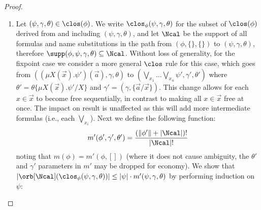 \begin{proof}
\begin{enumerate}
\begin{itemize}
			The case for $(\nu X(\vec x).\phi')(\vec a)$ is similar.
		\end{itemize}		
		\item 
		Let $(\psi, \gamma, \theta) \in \clos(\phi)$. 
		We write $\clos_\phi(\psi, \gamma, \theta)$ for the subset of $\clos(\phi)$ derived from and including $(\psi,\gamma, \theta)$, and let $\Ncal$ be the support of all formulas and name substitutions in the path from $(\phi,\{\}, \{\})$ to $(\psi,\gamma, \theta)$,
		therefore $\supp(\phi, \psi, \gamma, \theta) \subseteq \Ncal$.
		Without loss of generality, for the fixpoint case we consider a more general $\clos$ rule for this case, which goes from $((\mu X(\vec x).\psi')(\vec a),\gamma, \theta)$ to $(\bigvee\nolimits_{x_1}\dots\bigvee\nolimits_{x_n}\psi',\gamma',\theta')$ where $\theta' = \theta\{\mu X(\vec x).\psi' / X\}$ and $\gamma' = (\gamma, \{\vec a / \vec x\})$. 
		This change allows for each $x \in \vec x$ to become free sequentially, in contrast to making all $x \in \vec x$ free at once. 
		The impact on result is unaffected as this will add more intermediate formulas (i.e., each $\bigvee_{x_i}$).
		Next we define the following function:
		\[
		m'(\phi', \gamma', \theta') = \frac{(\|\phi'\| + |\Ncal|)!}{|\Ncal|!}
		\]
		noting that $m(\phi) = m'(\phi, [])$ (where it does not cause ambiguity, the $\theta'$ and $\gamma'$ parameters in $m'$ may be dropped for economy).
		We show that $|\orb[\Ncal](\clos_\phi(\psi, \gamma, \theta))| \le |\psi|\cdot m'(\psi, \gamma, \theta)$
		by performing induction on $\psi$:

\end{enumerate}
\end{proof}
